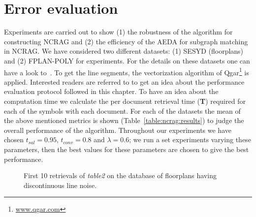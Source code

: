 \section{Error evaluation}
\label{sec:ncrag:results}
Experiments are carried out to show (1) the robustness of the algorithm for constructing NCRAG and (2) the efficiency of the AEDA for subgraph matching in NCRAG. We have considered two different datasets: (1) SESYD (floorplans) and (2) FPLAN-POLY for experiments. For the details on these datasets one can have a look to~. To get the line segments, the vectorization algorithm of Qgar\footnote{\url{www.qgar.com}} is applied. Interested readers are referred to  to get an idea about the performance evaluation protocol followed in this chapter. To have an idea about the computation time we calculate the per document retrieval time (\textbf{T}) required for each of the symbols with each document. For each of the datasets the mean of the above mentioned metrics is shown (Table~\ref{table:ncrag:results}) to judge the overall performance of the algorithm. Throughout our experiments we have chosen $t_{sal} = 0.95$, $t_{conv} = 0.8$ and $\lambda = 0.6$; we run a set experiments varying these parameters, then the best values for these parameters are chosen to give the best performance.
\begin{figure}[!h]
\centering  
{}
\hspace{0.5mm}
\hspace{0.5mm}
\hspace{0.5mm}
\hspace{0.5mm}
\hspace{0.5mm}
\hspace{0.5mm}
\hspace{0.5mm}
\hspace{0.5mm}
\hspace{0.5mm}
\caption{First 10 retrievals of \textit{table2} on the database of floorplans having discontinuous line noise.}
\label{fig:ncrag:ret-table2-discont}
\end{figure}

